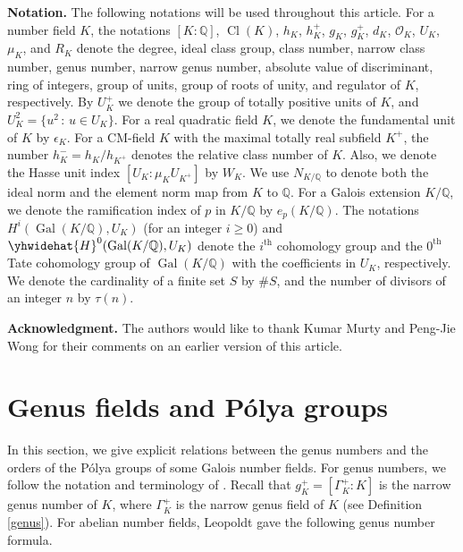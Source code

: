 \documentclass[12pt]{amsart}
\theoremstyle{definition}
\numberwithin{equation}{section}
\DeclareMathOperator{\Cl}{Cl}
\DeclareMathOperator{\Gal}{Gal}
\begin{document}
{\noindent \bf{Notation.}} The following notations will be used throughout this article.
For a number field $K$, the notations  $[K:\mathbb{Q}]$, $\Cl(K)$, $h_K$, $h_K^+$, $g_K$, $g_K^+$, $d_K$, $\mathcal{O}_K$, $U_K$, $\mu_K$, and $R_K$ denote the degree, ideal class group, class number, narrow class number, genus number, narrow genus number, absolute value of discriminant, ring of integers, group of units, group of roots of unity, and regulator of $K$, respectively. By $U_K^+$ we denote the group of totally positive units of $K$, and $	U_K^2=\{u^2 \, : \, u \in U_K\}$. For a real quadratic field $K$, we denote the fundamental unit of $K$ by $\epsilon_K$.
For a CM-field $K$ with the maximal totally real subfield $K^+$, the number $h_K^-=h_K/h_{K^+}$ denotes the relative class number of $K$. Also, we denote the Hasse unit index $\left[U_K:\mu_K U_{K^+}\right]$ by $W_K$. 
We use  $N_{K/\mathbb{Q}}$ to denote both the ideal norm and the element norm map from $K$ to $\mathbb{Q}$. For a Galois extension $K/\mathbb{Q}$,  we denote the ramification index of $p$ in $K/\mathbb{Q}$ by $e_p(K/\mathbb{Q})$. The notations $H^i(\Gal(K/\mathbb{Q}),U_K)$ (for an integer $i \geq 0$) and  $\yhwidehat{H}^{0}(\Gal(K/\mathbb{Q}),U_{K})$ denote
 the $i^{\text{th}}$ cohomology group and the $0^{\text{th}}$ Tate cohomology group of $\Gal(K/\mathbb{Q})$  with the coefficients in $U_K$, respectively. 
  We denote the cardinality of a finite set $S$ by $\# S$, and the number of divisors of an integer $n$ by $\tau(n)$.
\medskip\par
\noindent
\textbf{Acknowledgment.} The authors would like to  thank Kumar Murty and Peng-Jie Wong for their comments on an earlier version of this article. %



\section{Genus fields and P\'olya groups} \label{section, genus group}
In this section, we give explicit relations between the genus numbers and the orders of the P\'olya groups of some Galois number fields. 
For genus numbers, we follow the notation and terminology of \cite{Ishida}.
Recall that $g_K^+=[\Gamma_K^+: K]$ is the narrow genus number of $K$, where $\Gamma_K^+$ is the narrow genus field of $K$ (see Definition \ref{genus}).
For abelian number fields, Leopoldt \cite{Leopoldt} gave the following genus number formula.
\end{document}
